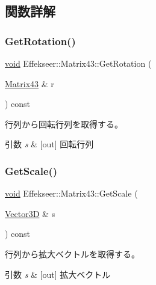 \subsection{関数詳解}
\mbox{\label{struct_effekseer_1_1_matrix43_a66360ac2c7e8ef69819409d3d44dbba1}} 
\subsubsection{\texorpdfstring{Get\+Rotation()}{GetRotation()}}
{\footnotesize\ttfamily \mbox{\hyperlink{namespace_effekseer_ab34c4088e512200cf4c2716f168deb56}{void}} Effekseer\+::\+Matrix43\+::\+Get\+Rotation (\begin{DoxyParamCaption}\item[{\mbox{\hyperlink{struct_effekseer_1_1_matrix43}{Matrix43}} \&}]{r }\end{DoxyParamCaption}) const}



行列から回転行列を取得する。 


\begin{DoxyParams}{引数}
{\em s} & \mbox{[}out\mbox{]} 回転行列 \\
\hline
\end{DoxyParams}
\mbox{\label{struct_effekseer_1_1_matrix43_afeae9f15d80c7d4965c307e3b3cf9462}} 
\subsubsection{\texorpdfstring{Get\+Scale()}{GetScale()}}
{\footnotesize\ttfamily \mbox{\hyperlink{namespace_effekseer_ab34c4088e512200cf4c2716f168deb56}{void}} Effekseer\+::\+Matrix43\+::\+Get\+Scale (\begin{DoxyParamCaption}\item[{\mbox{\hyperlink{struct_effekseer_1_1_vector3_d}{Vector3D}} \&}]{s }\end{DoxyParamCaption}) const}



行列から拡大ベクトルを取得する。 


\begin{DoxyParams}{引数}
{\em s} & \mbox{[}out\mbox{]} 拡大ベクトル \\
\hline
\end{DoxyParams}
\mbox{\label{struct_effekseer_1_1_matrix43_acd744255ba17ef26cffe31a7add9af28}} 
